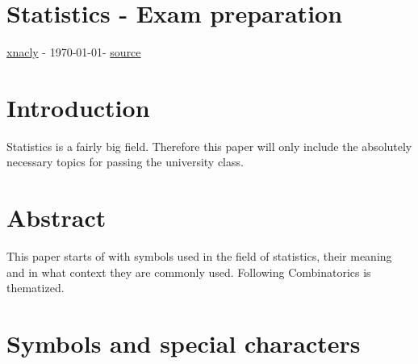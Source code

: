 \documentclass[twoside, a4paper, twocolumn]{article}
\begin{document}
    \section*{Statistics - Exam preparation}
    \href{https://xnacly.me}{xnacly} - \today - \href{https://github.com/xnacly/statistics}{source}

    \tableofcontents

    \section{Introduction}
    Statistics is a fairly big field. Therefore this paper will only include
    the absolutely necessary topics for passing the university class.

    \section{Abstract}
    This paper starts of with symbols used in the field of statistics, their
    meaning and in what context they are commonly used. Following Combinatorics
    is thematized.

    \section{Symbols and special characters}
\end{document}
